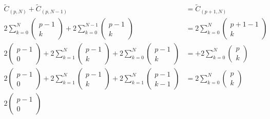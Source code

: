 \begin{align}
	\tilde C_{(p,N)} + \tilde C_{(p,N-1)} 
    &= \tilde C_{(p+1,N)}\\
    2 \sum_{k=0}^{N} \left( \begin{array}{c}
	p-1\\
	k
	\end{array}\right)
    +
    2 \sum_{k=0}^{N-1} \left( \begin{array}{c}
	p-1\\
	k
	\end{array}\right)
    &= 
    2 \sum_{k=0}^{N} \left( \begin{array}{c}
	p+1-1\\
	k
	\end{array}\right)\\
    2 \left( \begin{array}{c}
	p-1\\
	0
	\end{array}\right)
    +
    2 \sum_{k=1}^{N} \left( \begin{array}{c}
	p-1\\
	k
	\end{array}\right)
    +
    2 \sum_{k=0}^{N} \left( \begin{array}{c}
	p-1\\
	k
	\end{array}\right){}
    &= 
    +
    2 \sum_{k=0}^{N} \left( \begin{array}{c}
	p\\k
	\end{array}\right)\\
    2 \left( \begin{array}{c}
	p-1\\ 0
	\end{array}\right)
    +
    2 \sum_{k=1}^{N} \left( \begin{array}{c}
	p-1\\ k
	\end{array}\right)
    + 
    2 \sum_{k=1}^{N} \left( \begin{array}{c}
	p-1\\ k-1
	\end{array}\right)
    &=
    2 \sum_{k=0}^{N} \left( \begin{array}{c}
	p\\ k
	\end{array}\right)\\
    2 \left( \begin{array}{c}
	p-1\\ 0
	\end{array}\right)

\end{align}

